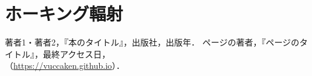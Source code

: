 \documentclass[uplatex,dvipdfmx]{vkaishi}
\begin{document}
\section{ホーキング輻射}




\begin{thebibliography}{99}
   著者1・著者2，『本のタイトル』，出版社，出版年．
   ページの著者，『ページのタイトル』，最終アクセス日，\\（\url{https://vuccaken.github.io}）．
\end{thebibliography}
\end{document}
